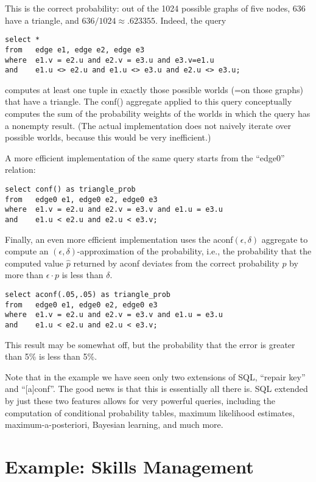 This is the correct probability: out of the 1024 possible
graphs of five nodes, 636 have a triangle, and $636/1024 \approx .623355$.
Indeed, the query
%
\begin{verbatim}
select *
from   edge e1, edge e2, edge e3
where  e1.v = e2.u and e2.v = e3.u and e3.v=e1.u
and    e1.u <> e2.u and e1.u <> e3.u and e2.u <> e3.u;
\end{verbatim}
%
computes at least one tuple in exactly those possible worlds (=on those
graphs) that have a triangle.
The conf() aggregate applied to this query conceptually
computes the sum of the probability
weights of the worlds in which the query has a nonempty result.
(The actual implementation does not naively iterate over possible
worlds, because this would be very inefficient.)

A more efficient implementation of the same query starts from the
``edge0'' relation:
%
\begin{verbatim}
select conf() as triangle_prob
from   edge0 e1, edge0 e2, edge0 e3
where  e1.v = e2.u and e2.v = e3.v and e1.u = e3.u
and    e1.u < e2.u and e2.u < e3.v;
\end{verbatim}

Finally, an even more efficient implementation uses the
aconf$(\epsilon, \delta)$ aggregate
to compute an $(\epsilon, \delta)$-approximation of the probability,
i.e., the probability that the computed value $\hat{p}$ returned by aconf
deviates from the
correct probability $p$ by more than $\epsilon \cdot p$ is less than $\delta$.
%
\begin{verbatim}
select aconf(.05,.05) as triangle_prob
from   edge0 e1, edge0 e2, edge0 e3
where  e1.v = e2.u and e2.v = e3.v and e1.u = e3.u
and    e1.u < e2.u and e2.u < e3.v;
\end{verbatim}

This result may be somewhat off, but the probability that the error is greater
than 5\% is less than 5\%.


Note that in the example we have seen only two extensions of SQL, ``repair
key'' and ``[a]conf''. The good news is that this is essentially
all there is. SQL extended by just these two features allows for very powerful
queries, including the computation of conditional probability tables,
maximum likelihood estimates, maximum-a-posteriori, Bayesian learning,
and much more.


\section{Example: Skills Management}


